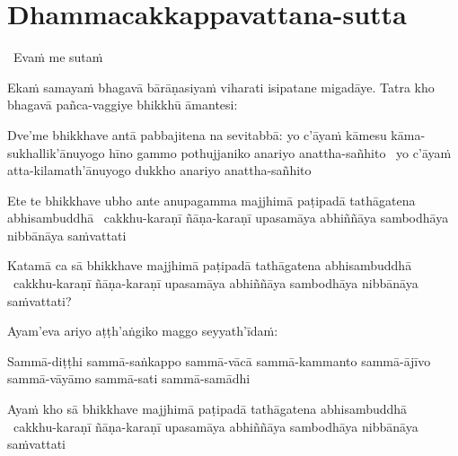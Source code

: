 
\section{Dhammacakkappavattana-sutta}
\label{dhammacakkappavattana-full}

\begin{leader}
  \anglebracketleft\ \hspace{-0.5mm}Evaṁ me sutaṁ \hspace{-0.5mm}\anglebracketright\
\end{leader}

\begin{pali-hang}
  Ekaṁ samayaṁ bhagavā bārāṇasiyaṁ viharati isipatane migadāye.  Tatra kho bhagavā pañca-vaggiye bhikkhū āmantesi:
\end{pali-hang}

\begin{pali-hang}
  Dve'me bhikkhave antā pabbajitena na sevitabbā: yo c'āyaṁ kāmesu kāma-sukhallik'ānuyogo hīno gammo pothujjaniko anariyo anattha-sañhito \breathmark\ yo c'āyaṁ atta-kilamath'ānuyogo dukkho anariyo anattha-sañhito
\end{pali-hang}

\begin{pali-hang}
  Ete te bhikkhave ubho ante anupagamma majjhimā paṭipadā tathāgatena abhisambuddhā \breathmark\ cakkhu-karaṇī ñāṇa-karaṇī upasamāya abhiññāya sambodhāya nibbānāya saṁvattati
\end{pali-hang}

\begin{pali-hang}
  Katamā ca sā bhikkhave majjhimā paṭipadā tathāgatena abhisambuddhā \breathmark\ cakkhu-karaṇī ñāṇa-karaṇī upasamāya abhiññāya sambodhāya nibbānāya saṁvattati?
\end{pali-hang}

\begin{pali-hang}
  Ayam'eva ariyo aṭṭh'aṅgiko maggo seyyath'īdaṁ:
\end{pali-hang}

\begin{pali-hang}
  Sammā-diṭṭhi sammā-saṅkappo sammā-vācā sammā-kammanto sammā-ājīvo sammā-vāyāmo sammā-sati sammā-samādhi
\end{pali-hang}

\begin{pali-hang}
  Ayaṁ kho sā bhikkhave majjhimā paṭipadā tathāgatena abhisambuddhā \breathmark\ cakkhu-karaṇī ñāṇa-karaṇī upasamāya abhiññāya sambodhāya nibbānāya saṁvattati
\end{pali-hang}

